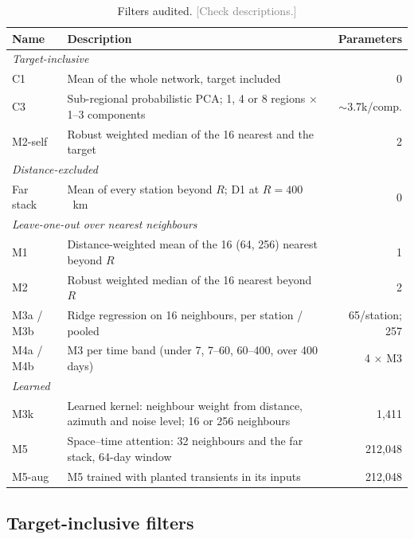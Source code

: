 \documentclass[preprint,12pt,authoryear]{elsarticle}
\newcommand{\towrite}[1]{\textcolor{gray}{[#1]}}
\begin{document}
\begin{table}[t]
  \centering
  \small
  \caption{Filters audited. \towrite{Check descriptions.}}
  \label{tab:filters}
  \begin{tabular}{p{2.1cm}p{7.7cm}r}
    \toprule
    Name & Description & Parameters \\
    \midrule
    \multicolumn{3}{l}{\textit{Target-inclusive}} \\
    C1 & Mean of the whole network, target included & 0 \\
    C3 & Sub-regional probabilistic PCA; 1, 4 or 8 regions $\times$ 1--3 components & $\sim$3.7k/comp. \\
    M2-self & Robust weighted median of the 16 nearest and the target & 2 \\
    \multicolumn{3}{l}{\textit{Distance-excluded}} \\
    Far stack & Mean of every station beyond $R$; D1 at $R = 400$~km & 0 \\
    \multicolumn{3}{l}{\textit{Leave-one-out over nearest neighbours}} \\
    M1 & Distance-weighted mean of the 16 (64, 256) nearest beyond $R$ & 1 \\
    M2 & Robust weighted median of the 16 nearest beyond $R$ & 2 \\
    M3a / M3b & Ridge regression on 16 neighbours, per station / pooled & 65/station; 257 \\
    M4a / M4b & M3 per time band (under 7, 7--60, 60--400, over 400 days) & 4 $\times$ M3 \\
    \multicolumn{3}{l}{\textit{Learned}} \\
    M3k & Learned kernel: neighbour weight from distance, azimuth and noise level; 16 or 256 neighbours & 1,411 \\
    M5 & Space--time attention: 32 neighbours and the far stack, 64-day window & 212,048 \\
    M5-aug & M5 trained with planted transients in its inputs & 212,048 \\
    \bottomrule
  \end{tabular}
\end{table}

\subsection{Target-inclusive filters}
\label{sec:filters-inclusive}
\end{document}
